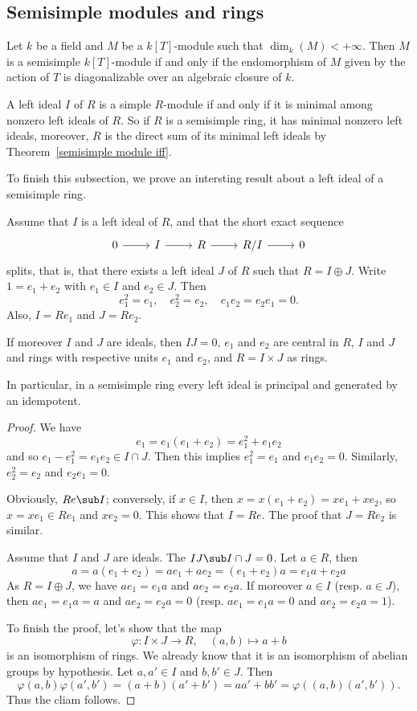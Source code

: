 \subsection{Semisimple modules and rings}
\begin{example}
Let $k$ be a field and $M$ be a $k[T]$-module such that $\dim_k(M)<+\infty$. Then $M$ is a semisimple $k[T]$-module if and only if the endomorphism of $M$ given by the action of $T$ is diagonalizable over an algebraic closure of $k$.
\end{example}
\begin{remark}
A left ideal $I$ of $R$ is a simple $R$-module if and only if it is minimal
among nonzero left ideals of $R$. So if $R$ is a semisimple ring, it has minimal nonzero left ideals, moreover, $R$ is the direct sum of its minimal left ideals by Theorem~\ref{semisimple module iff}.
\end{remark}
To finish this subsection, we prove an intersting result about a left ideal of a semisimple ring.
\begin{proposition}\label{split left ideal principal}
Assume that $I$ is a left ideal of $R$, and that the short exact sequence 
\[\begin{tikzcd}
0\ar[r]&I\ar[r]&R\ar[r]&R/I\ar[r]&0
\end{tikzcd}\]
splits, that is, that there exists a left ideal $J$ of $R$ such that $R=I\oplus J$. Write $1=e_1+e_2$ with $e_1\in I$ and $e_2\in J$. Then 
\[e_1^2=e_1,\quad e_2^2=e_2,\quad e_1e_2=e_2e_1=0.\]
Also, $I=Re_1$ and $J=Re_2$.\par
If moreover $I$ and $J$ are ideals, then $IJ=0$, $e_1$ and $e_2$ are central in $R$, $I$ and $J$ and rings with respective units $e_1$ and $e_2$, and $R=I\times J$ as rings.\par
In particular, in a semisimple ring every left ideal is principal and generated by an idempotent.
\end{proposition}
\begin{proof}
We have 
\[e_1=e_1(e_1+e_2)=e_1^2+e_1e_2\]
and so $e_1-e_1^2=e_1e_2\in I\cap J$. Then this implies $e_1^2=e_1$ and $e_1e_2=0$. Similarly, $e_2^2=e_2$ and $e_2e_1=0$.\par 
Obviously, $Re\sub I$; conversely, if $x\in I$, then $x=x(e_1+e_2)=xe_1+xe_2$, so $x=xe_1\in Re_1$ and $xe_2=0$. This shows that $I=Re$. The proof that $J=Re_2$ is similar.\par
Assume that $I$ and $J$ are ideals. The $IJ\sub I\cap J=0$. Let $a\in R$, then
\[a=a(e_1+e_2)=ae_1+ae_2=(e_1+e_2)a=e_1a+e_2a\]
As $R=I\oplus J$, we have $ae_1=e_1a$ and $ae_2=e_2a$. If moreover $a\in I$ (resp. $a\in J$), then $ae_1=e_1a=a$ and $ae_2=e_2a=0$ (resp. $ae_1=e_1a=0$ and $ae_2=e_2a=1$).\par
To finish the proof, let's show that the map 
\[\varphi:I\times J\to R,\quad (a,b)\mapsto a+b\]
is an isomorphism of rings. We already know that it is an isomorphism of abelian groups by hypothesis. Let $a,a'\in I$ and $b,b'\in J$. Then
\[\varphi(a,b)\varphi(a',b')=(a+b)(a'+b')=aa'+bb'=\varphi((a,b)(a',b')).\]
Thus the cliam follows.
\end{proof}
